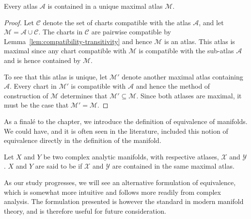 \begin{proposition}
	Every atlas $ \mathcal{A} $ is contained in a unique maximal atlas $ \mathcal{M}
	$.
	\begin{proof}
		Let $ \mathcal{C} $ denote the set of charts compatible with the atlas $
			\mathcal{A} $, and let $ \mathcal{M} = \mathcal{A}\cup \mathcal{C} $. The charts
		in $ \mathcal{C} $ are pairwise compatible by
		Lemma~\ref{lem:compatibility-transitivity} and hence $ \mathcal{M} $ is an
		atlas. This atlas is maximal since any chart compatible with $ \mathcal{M} $ is
		compatible with the sub-atlas $ \mathcal{A} $ and is hence contained by $
			\mathcal{M} $.

		To see that this atlas is unique, let $ \mathcal{M}' $ denote another maximal
		atlas containing $ \mathcal{A} $. Every chart in $ \mathcal{M}' $ is compatible
		with $ \mathcal{A} $ and hence the method of construction of $ \mathcal{M} $
		determines that $ \mathcal{M}' \subseteq \mathcal{M} $. Since both atlases are
		maximal, it must be the case that $ \mathcal{M}'=\mathcal{M} $.
	\end{proof}
\end{proposition}

As a final\'e to the chapter, we introduce the definition of equivalence of
manifolds. We could have, and it is often seen in the
literature, included this notion of
equivalence directly in the definition of the manifold.

\begin{definition}
	Let $ X $ and $ Y $ be two complex analytic manifolds, with respective atlases,
	$ \mathcal{X} $ and $ \mathcal{Y} $. $ X $ and $ Y $ are said to be
	 if $ \mathcal{X} $ and $ \mathcal{Y} $ are contained in the
	same maximal atlas.
\end{definition}

As our study progresses, we will see an alternative formulation of equivalence,
which is somewhat more intuitive and follows more readily from complex analysis.
The formulation presented is however the standard in modern manifold theory, and
is therefore useful for future consideration.
